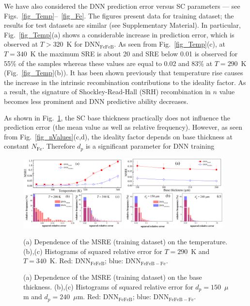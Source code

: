 \documentclass[num-refs]{wiley-article} %
\begin{document}
We have also considered the DNN prediction error versus SC parameters  ---
see Figs.~\ref{fig_Temp}--~\ref{fig_Fe}.
The figures present data for training dataset; the results for test datasets are similar
(see Supplementary Material).
In particular, Fig.~\ref{fig_Temp}(a) shows a considerable increase in prediction error,
which is observed at $T>320$~K for DNN$_\mathrm{FeFeB}$.
As seen from Fig.~\ref{fig_Temp}(c), at $T=340$~K the maximum SRE is about 20 and
SRE below 0.01 is observed for 55\% of the samples
whereas these values are equal to 0.02 and 83\% at $T=290$~K
(Fig.~\ref{fig_Temp}(b)).
It has been shown previously \cite{OlikhJPS} that temperature rise causes the increase in
the intrinsic recombination contributions to the ideality factor.
As a result, the signature of Shockley-Read-Hall (SRH) recombination in $n$ value becomes less prominent
and DNN predictive ability decreases.

As shown in Fig.~\ref{fig_depth}, the SC base thickness practically does not influence the prediction error
(the mean value as well as relative frequency).
However, as seen from Fig.~\ref{fig_nValues}(c,d),
the ideality factor depends on base thickness at constant $N_\mathrm{Fe}$.
Therefore $d_p$ is a significant parameter for DNN training


\begin{figure}[tb]
\centering
\includegraphics[width=0.48\textwidth]{Fig4} \hfill
\includegraphics[width=0.48\textwidth]{Fig5} \\
\parbox[t]{0.48\textwidth}
{\caption{(a) Dependence of the MSRE (training dataset) on the temperature.
(b),(c) Histograms of squared relative error for $T=290$~K and $T=340$~K.
Red: DNN$_\mathrm{FeFeB}$; blue: DNN$_\mathrm{FeFeB-Fe}$.
}
\label{fig_Temp}} \hfill
\parbox[t]{0.48\textwidth}{\caption{(a) Dependence of the MSRE (training dataset) on the base thickness.
(b),(c) Histograms of squared relative error for $d_p=150$~$\mu$m and $d_p=240$~$\mu$m.
Red: DNN$_\mathrm{FeFeB}$; blue: DNN$_\mathrm{FeFeB-Fe}$.}
\label{fig_depth}}
\end{figure}
\end{document}

